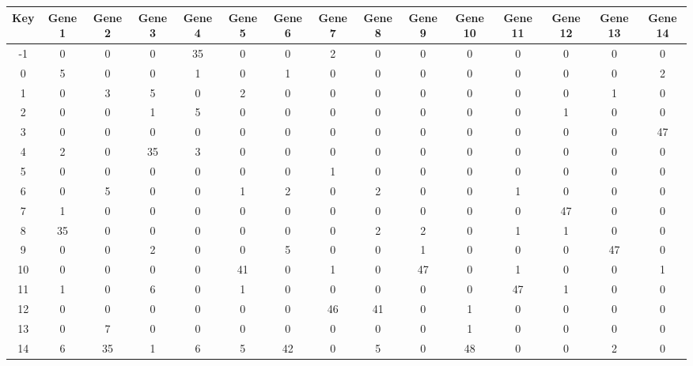 \begin{tabular}{|c|c|c|c|c|c|c|c|c|c|c|c|c|c|c|}
\hline
Key & Gene 1 & Gene 2 & Gene 3 & Gene 4 & Gene 5 & Gene 6 & Gene 7 & Gene 8 & Gene 9 & Gene 10 & Gene 11 & Gene 12 & Gene 13 & Gene 14 \\
\hline
-1 & 0 & 0 & 0 & 35 & 0 & 0 & 2 & 0 & 0 & 0 & 0 & 0 & 0 & 0 \\
0 & 5 & 0 & 0 & 1 & 0 & 1 & 0 & 0 & 0 & 0 & 0 & 0 & 0 & 2 \\
1 & 0 & 3 & 5 & 0 & 2 & 0 & 0 & 0 & 0 & 0 & 0 & 0 & 1 & 0 \\
2 & 0 & 0 & 1 & 5 & 0 & 0 & 0 & 0 & 0 & 0 & 0 & 1 & 0 & 0 \\
3 & 0 & 0 & 0 & 0 & 0 & 0 & 0 & 0 & 0 & 0 & 0 & 0 & 0 & 47 \\
4 & 2 & 0 & 35 & 3 & 0 & 0 & 0 & 0 & 0 & 0 & 0 & 0 & 0 & 0 \\
5 & 0 & 0 & 0 & 0 & 0 & 0 & 1 & 0 & 0 & 0 & 0 & 0 & 0 & 0 \\
6 & 0 & 5 & 0 & 0 & 1 & 2 & 0 & 2 & 0 & 0 & 1 & 0 & 0 & 0 \\
7 & 1 & 0 & 0 & 0 & 0 & 0 & 0 & 0 & 0 & 0 & 0 & 47 & 0 & 0 \\
8 & 35 & 0 & 0 & 0 & 0 & 0 & 0 & 2 & 2 & 0 & 1 & 1 & 0 & 0 \\
9 & 0 & 0 & 2 & 0 & 0 & 5 & 0 & 0 & 1 & 0 & 0 & 0 & 47 & 0 \\
10 & 0 & 0 & 0 & 0 & 41 & 0 & 1 & 0 & 47 & 0 & 1 & 0 & 0 & 1 \\
11 & 1 & 0 & 6 & 0 & 1 & 0 & 0 & 0 & 0 & 0 & 47 & 1 & 0 & 0 \\
12 & 0 & 0 & 0 & 0 & 0 & 0 & 46 & 41 & 0 & 1 & 0 & 0 & 0 & 0 \\
13 & 0 & 7 & 0 & 0 & 0 & 0 & 0 & 0 & 0 & 1 & 0 & 0 & 0 & 0 \\
14 & 6 & 35 & 1 & 6 & 5 & 42 & 0 & 5 & 0 & 48 & 0 & 0 & 2 & 0 \\
\hline
\end{tabular}